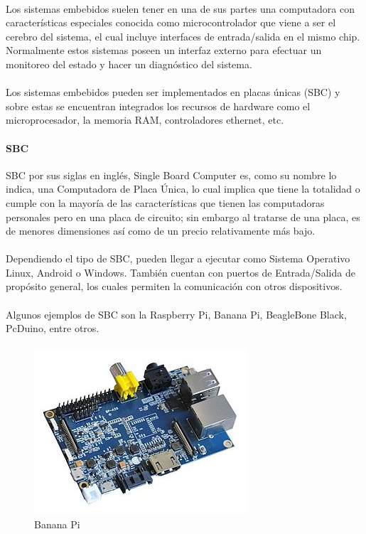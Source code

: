 \paragraph{}
Los sistemas embebidos suelen tener en una de sus partes una computadora con características especiales conocida como microcontrolador que viene a ser el cerebro del sistema, el cual incluye interfaces de entrada/salida en el mismo chip. Normalmente estos sistemas poseen un interfaz externo para efectuar un monitoreo del estado y hacer un diagnóstico del sistema.\citep{MarcoTeorico15}
\paragraph{}
Los sistemas embebidos pueden ser implementados en placas únicas (SBC) y sobre estas se encuentran integrados los recursos de hardware como el microprocesador, la memoria RAM, controladores ethernet, etc.\citep{MarcoTeorico14}
\paragraph{SBC}
SBC por sus siglas en inglés, Single Board Computer es, como su nombre lo indica, una Computadora de Placa Única, lo cual implica que tiene la totalidad o cumple con la mayoría de las características que tienen las computadoras personales pero en una placa de circuito; sin embargo al tratarse de una placa, es de menores dimensiones así como de un precio relativamente más bajo.
\paragraph{}
Dependiendo el tipo de SBC, pueden llegar a ejecutar como Sistema Operativo Linux, Android o Windows. También cuentan con puertos de Entrada/Salida de propósito general, los cuales permiten la comunicación con otros dispositivos.\citep{MarcoTeorico18}  
\paragraph{}
Algunos ejemplos de SBC son la Raspberry Pi, Banana Pi, BeagleBone Black, PcDuino, entre otros.
\paragraph{}
\begin{figure}[H]
	\centering
	\includegraphics[scale=.8]{Capitulo2/images/bananaPi.jpg}
	\caption{Banana Pi}
	\label{fig:diagrama_dispMonitoreo}
\end{figure}

